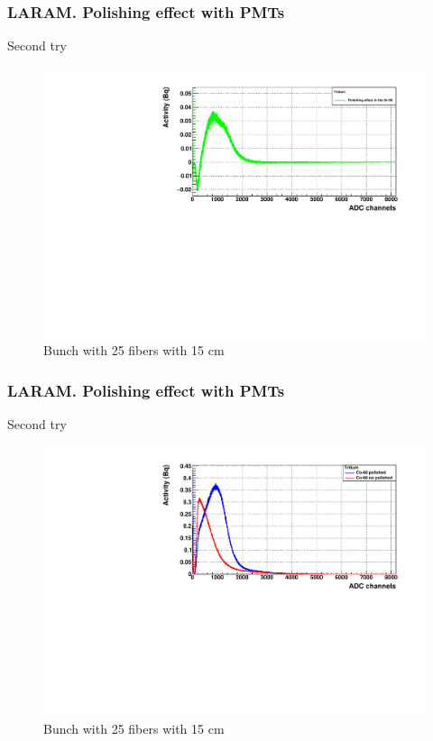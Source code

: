 \documentclass{beamer}
\begin{document}
\begin{frame}
\frametitle{LARAM. Polishing effect with PMTs}
Second try

\begin{figure}[hbtp]
\centering
\includegraphics[scale=0.5]{LARAM/Polishing_effect/Second_try/Sr_90_clear.pdf}
\caption{Bunch with 25 fibers with 15 cm}
\end{figure}

\end{frame}

\begin{frame}
\frametitle{LARAM. Polishing effect with PMTs}
Second try

\begin{figure}[hbtp]
\centering
\includegraphics[scale=0.5]{LARAM/Polishing_effect/Second_try/Co_60.pdf}
\caption{Bunch with 25 fibers with 15 cm}
\end{figure}

\end{frame}
\end{document}
